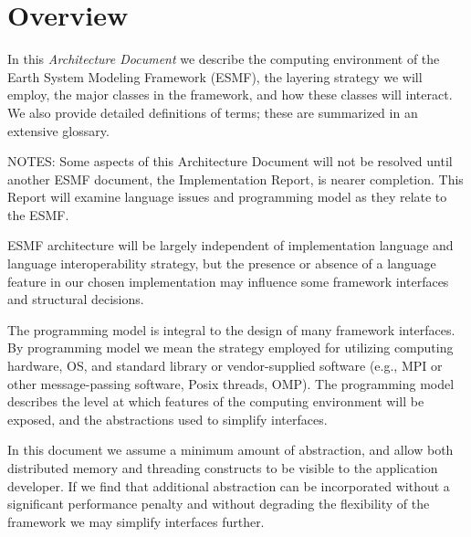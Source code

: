\section{Overview}

In this {\it Architecture Document} we describe the computing environment of the Earth 
System Modeling Framework (ESMF), the layering strategy we will employ, the major classes 
in the framework, and how these classes will interact.  We also provide detailed definitions of 
terms; these are summarized in an extensive glossary. 

NOTES: \newline
Some aspects of this Architecture Document will not be resolved until
another ESMF document, the Implementation Report, is nearer completion.  This Report
will examine language issues and programming model as they relate to the ESMF.

ESMF architecture will be largely independent of implementation language
and language interoperability strategy, but the presence or absence of a language feature 
in our chosen implementation may influence some framework interfaces and structural decisions.

The programming model is integral to the design of many framework interfaces.  
By programming model we mean the strategy employed for utilizing computing hardware, 
OS, and standard library or vendor-supplied software (e.g., MPI or other message-passing 
software, Posix threads, OMP).  The programming model describes the level at which 
features of the computing environment will be exposed, and the abstractions used to 
simplify interfaces.

In this document we assume a minimum amount of abstraction, and allow both distributed 
memory and threading constructs to be visible to the application developer.  If we find 
that additional abstraction can be incorporated without a significant performance penalty 
and without degrading the flexibility of the framework we may simplify interfaces further.




